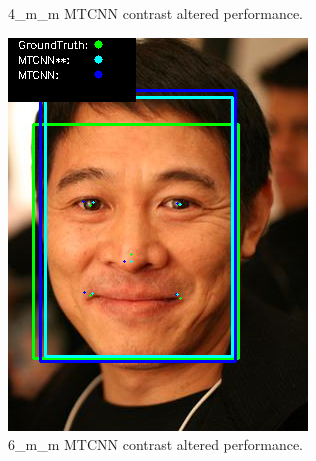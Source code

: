 \documentclass{l4proj}
\begin{document}
\begin{appendices}
\begin{figure}[h!]
\begin{minipage}{0.49\textwidth}
    \caption{4\_m\_m MTCNN contrast altered performance.}
    \label{whoopi_result}
  \end{minipage}
\end{figure}

\begin{figure}[h!]
  \centering
  \begin{minipage}{0.49\textwidth}
    \centering
     \includegraphics[width=\textwidth]{images/mtcnn/6.png}
    \caption{6\_m\_m MTCNN contrast altered performance.}
    \label{whoopi_result}
  \end{minipage}
    \hfill
    \begin{minipage}{0.49\textwidth}
    \centering

\end{minipage}
\end{figure}
\end{appendices}
\end{document}

